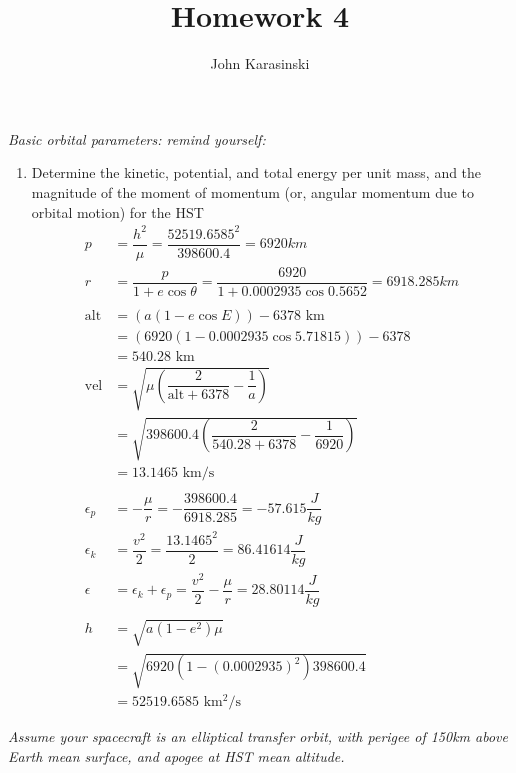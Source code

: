 \documentclass[onecolumn,10pt]{jhwhw}
\author{John Karasinski}
\title{Homework 4}
\begin{document}

\problem{}
\textit{Basic orbital parameters: remind yourself:}
\begin{enumerate}
\item Determine the kinetic, potential, and total energy per unit mass, and the magnitude of the moment of
momentum (or, angular momentum due to orbital motion) for the HST
\begin{align*}
p &= \dfrac{h^2}{\mu} = \dfrac{52519.6585^2}{398600.4} = 6920 km\\
r &= \dfrac{p}{1 + e \cos{\theta}} = \dfrac{6920}{1 + 0.0002935 \cos{0.5652}} = 6918.285 km\\
\\
\mbox{alt} &= \left( a (1-e \cos{E}) \right) - 6378 \mbox{ km} \\
           &= \left( 6920 (1-0.0002935 \cos{5.71815}) \right) - 6378 \\
           &= 540.28 \mbox{ km} \\
\mbox{vel} &= \sqrt{\mu \left( \dfrac{2}{\mbox{alt} + 6378} - \dfrac{1}{a} \right)} \\
           &= \sqrt{398600.4 \left( \dfrac{2}{540.28 + 6378} - \dfrac{1}{6920} \right)} \\
           &=13.1465 \mbox{ km/s}\\
\\
\epsilon_p &= - \dfrac{\mu}{r} = - \dfrac{398600.4}{6918.285} = -57.615 \dfrac{J}{kg} \\
\epsilon_k &= \dfrac{v^2}{2} = \dfrac{13.1465^2}{2} = 86.41614 \dfrac{J}{kg} \\
\epsilon &= \epsilon_k + \epsilon_p = \dfrac{v^2}{2} - \dfrac{\mu}{r} = 28.80114 \dfrac{J}{kg} \\
\\
h &= \sqrt{a(1-e^2)\mu} \\
  &= \sqrt{6920 (1-(0.0002935)^2) 398600.4} \\
  &= 52519.6585 \mbox{ km$^2$/s}
\end{align*}
\end{enumerate}

\clearpage
\problem{}
\textit{Assume your spacecraft is an elliptical transfer orbit, with perigee of 150km above Earth mean surface, and apogee at HST mean altitude.}
\end{document}

